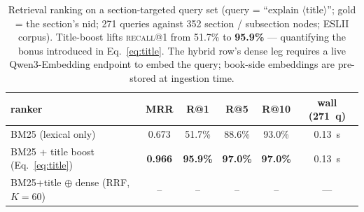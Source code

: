 \begin{table}[!htbp]
\centering
\caption{Retrieval ranking on a section-targeted query set (query = ``explain $\langle$title$\rangle$''; gold = the section's nid; 271 queries against 352 section / subsection nodes; ESLII corpus).  Title-boost lifts \textsc{recall@1} from 51.7\% to \textbf{95.9\%} --- quantifying the bonus introduced in Eq.~\ref{eq:title}.  The hybrid row's dense leg requires a live Qwen3-Embedding endpoint to embed the query; book-side embeddings are pre-stored at ingestion time.}
\label{tab:m2-retrieval}
\small
\begin{tabular}{lccccc}
\toprule
ranker & MRR & R@1 & R@5 & R@10 & wall (271~q) \\
\midrule
BM25 (lexical only) & 0.673 & 51.7\% & 88.6\% & 93.0\% & 0.13~s \\
BM25 + title boost (Eq.~\ref{eq:title}) & \textbf{0.966} & \textbf{95.9\%} & \textbf{97.0\%} & \textbf{97.0\%} & 0.13~s \\
BM25+title $\oplus$ dense (RRF, $K\!=\!60$) & -- & -- & -- & -- & --- \\
\bottomrule
\end{tabular}\\ 
\end{table}
